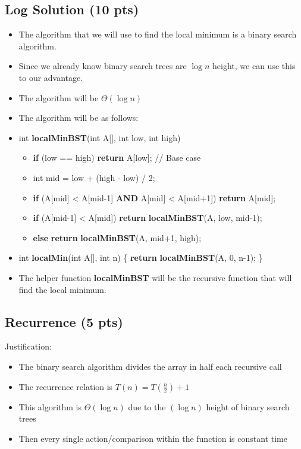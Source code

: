 \documentclass{article}[12pt]
\begin{document}
\pagebreak

\vspace*{10px}
\subsection{Log Solution (10 pts)}

\begin{itemize}
  \item The algorithm that we will use to find the local minimum is a binary search algorithm.
  \item Since we already know binary search trees are $\log n$ height, we can use this to our advantage.
  \item The algorithm will be $\Theta(\log n)$
  \item The algorithm will be as follows:
  \item int \textbf{localMinBST}(int A[], int low, int high)
    \begin{itemize}
      \item \textbf{if} (low == high) \textbf{return} A[low]; // Base case
      \item int mid = low + (high - low) / 2;
      \item \textbf{if} (A[mid] < A[mid-1] \textbf{AND} A[mid] < A[mid+1]) \textbf{return} A[mid];
      \item \textbf{if} (A[mid-1] < A[mid]) \textbf{return} \textbf{localMinBST}(A, low, mid-1);
      \item \textbf{else} \textbf{return} \textbf{localMinBST}(A, mid+1, high);
    \end{itemize}
  \item int \textbf{localMin}(int A[], int n) \{ \textbf{return} \textbf{localMinBST}(A, 0, n-1); \}
  \item The helper function \textbf{localMinBST} 
    will be the recursive function that will find the local minimum.
\end{itemize}

\vspace*{10px}
\subsection{Recurrence (5 pts)}
Justification:
\begin{itemize}
  \item The binary search algorithm divides the array in half each recursive call
  \item The recurrence relation is $T(n) = T(\frac{n}{2}) + 1$
  \item This algorithm is $\Theta(\log n)$ due to the $(\log n)$ height of binary search trees
  \item Then every single action/comparison within the function is constant time
\end{itemize}
\end{document}
